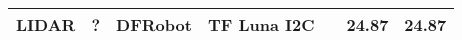 \documentclass[main.tex]{subfiles} %
\begin{document}
\begin{table}[h]
{\begin{tabular}{|p{3cm}|p{2.5cm}|p{2.5cm}|p{3cm}|p{1cm}|p{1.5cm}|p{1cm}|}
        LIDAR                                  & ?                      & DFRobot                       & TF Luna I2C                     &                     & 24.87                      & 24.87                           \\ \hline

\end{tabular}}
\end{table}
\end{document}
